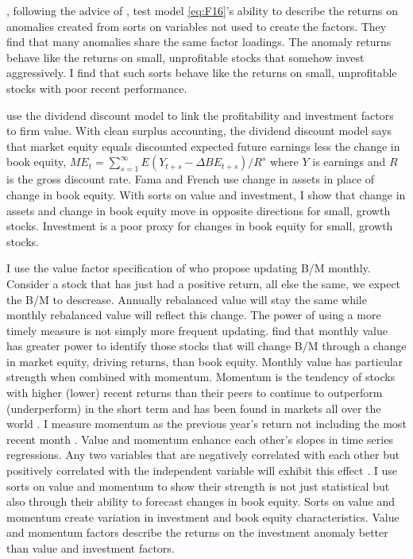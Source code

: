 \textcite{fama2016dissecting}, following the advice of
\textcite{lewellen2010skeptical}, test model \ref{eq:F16}'s ability to describe
the returns on anomalies created from sorts on variables not used to create the
factors. They find that many anomalies share the same factor loadings. The
anomaly returns behave like the returns on small, unprofitable stocks that
somehow invest aggressively. I find that such sorts behave like the returns on
small, unprofitable stocks with poor recent performance.

\textcite{fama2006profitability} use the dividend discount model to link the
profitability and investment factors to firm value.
With clean surplus accounting, the dividend discount model says that market
equity equals discounted expected future earnings less the change in book
equity,
$ME_t = \sum_{s=1}^\infty E(Y_{t+s}-\Delta BE_{t+s})/R^s$
where $Y$ is earnings and $R$ is the gross discount rate.
Fama and French use change in assets in place of change in book equity.
With sorts on value and investment, I show that change in assets and change in
book equity move in opposite directions for small, growth stocks.
Investment is a poor proxy for changes in book equity for small, growth stocks.

I use the value factor specification of \textcite{asness2013devil} who propose
updating B/M monthly. Consider a stock that has just had a positive return, all
else the same, we expect the B/M to descrease. Annually rebalanced value will
stay the same while monthly rebalanced value will reflect this change. The
power of using a more timely measure is not simply more frequent updating.
\textcite{kok2017facts} find that monthly value has greater power to identify
those stocks that will change B/M through a change in market equity, driving
returns, than book equity. Monthly value has particular strength when combined
with momentum. Momentum is the tendency of stocks with higher (lower) recent
returns than their peers to continue to outperform (underperform) in the short
term \parencite{jegadeesh1993returns} and has been found in markets all over
the world \parencite{asness2013value}. I measure momentum as the previous
year's return not including the most recent month
\parencite{fama2016dissecting}. Value and momentum enhance each other's slopes
in time series regressions. Any two variables that are negatively correlated
with each other but positively correlated with the independent variable will
exhibit this effect \parencite{fama2015incremental}. I use sorts on value and
momentum to show their strength is not just statistical but also through their
ability to forecast changes in book equity. Sorts on value and momentum create
variation in investment and book equity characteristics. Value and momentum
factors describe the returns on the investment anomaly better than value and
investment factors.

